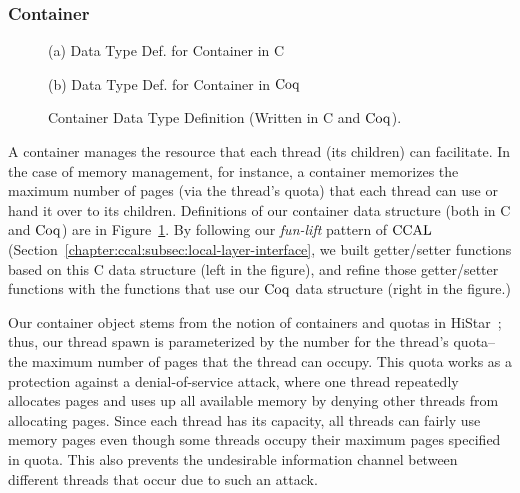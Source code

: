 \subsubsection{Container} 
\begin{figure}
\begin{minipage}[t]{.45\textwidth}
\raggedright
 
\begin{center}
(a) Data Type Def. for Container in C
\end{center}
\end{minipage}
\hfill
\noindent
\begin{minipage}[t]{.45\textwidth}
\raggedleft
 
\begin{center}
(b) Data Type Def. for Container in $\mathrm{Coq}$
\end{center}
\end{minipage}
\caption{Container Data Type Definition (Written in C and $\mathrm{Coq}$).}
\label{fig:chapter:certikos:container}
\end{figure}
A container manages the resource that each thread (its children) can facilitate.
In the case of memory management, for instance,
a container memorizes the maximum number of pages (via the thread's quota) 
that each thread can use or hand it over to its children.
Definitions of our container data structure (both in C and $\mathrm{Coq}$) are in 
Figure~\ref{fig:chapter:certikos:container}. 
By following our \textit{fun-lift} pattern of $\mathrm{CCAL}$ (Section~\ref{chapter:ccal:subsec:local-layer-interface}, 
we built getter/setter functions based on this C data structure (left in the figure), 
and refine those getter/setter functions with the functions that use our $\mathrm{Coq}$ data structure (right in the figure.)


Our container object stems from the notion of containers and quotas in HiStar~\cite{zeldovich06};
thus, our thread spawn is parameterized by the number for the thread's  quota--the maximum number of pages that 
the thread can occupy.
This quota works as a protection against a denial-of-service attack, where one thread repeatedly allocates pages and uses up all available memory
by denying other threads from allocating pages.
Since each thread has its capacity, all threads can fairly use memory pages even though some threads occupy their maximum pages specified in quota. 
This also prevents the undesirable information channel between different threads that occur due to such an attack.

